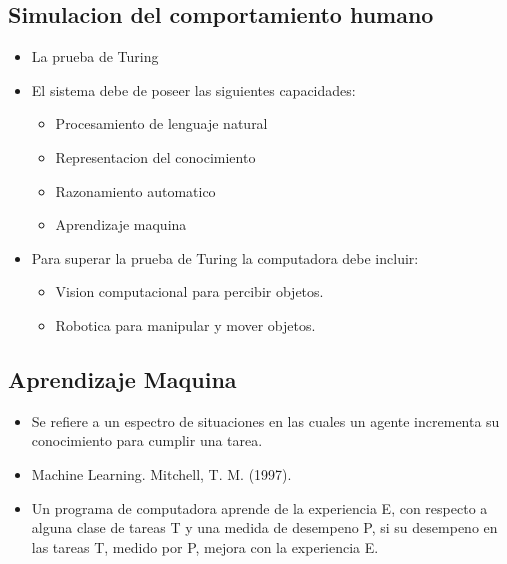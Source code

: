 \documentclass[11pt]{article}
\begin{document}
\subsection{Simulacion del comportamiento humano}
\label{sec:orge064234}
\begin{itemize}
\item La prueba de Turing
\item El sistema debe de poseer las siguientes capacidades:
\begin{itemize}
\item Procesamiento de lenguaje natural
\item Representacion del conocimiento
\item Razonamiento automatico
\item Aprendizaje maquina
\end{itemize}
\item Para superar la prueba de Turing la computadora debe incluir:
\begin{itemize}
\item Vision computacional para percibir objetos.
\item Robotica para manipular y mover objetos.
\end{itemize}
\end{itemize}
\subsection{Aprendizaje Maquina}
\label{sec:orgd5f2089}
\begin{itemize}
\item Se refiere a un espectro de situaciones en las cuales un agente incrementa su conocimiento para cumplir una tarea.
\item Machine Learning. Mitchell, T. M. (1997).
\item Un programa de computadora aprende de la experiencia E, con respecto a alguna clase de tareas T y una medida de desempeno P, si su desempeno en las tareas T, medido por P, mejora con la experiencia E.
\end{itemize}
\end{document}
